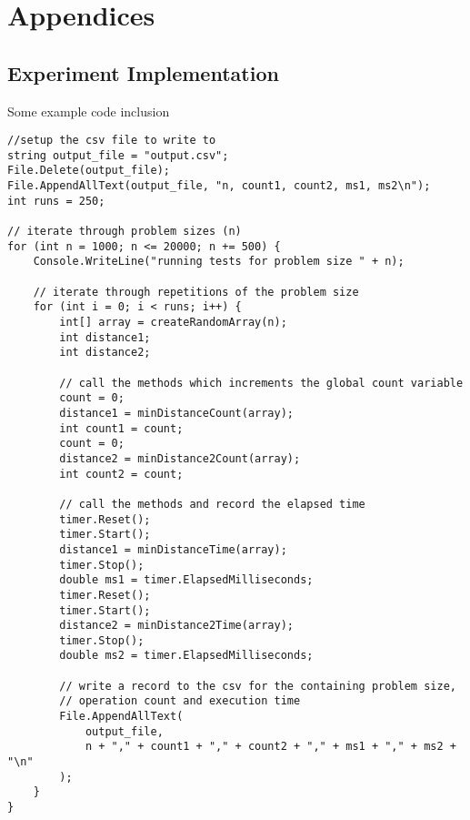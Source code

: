 \newpage
\section{Appendices}

\subsection{Experiment Implementation}\label{app:experiment}
Some example code inclusion

\begin{lstlisting}
//setup the csv file to write to
string output_file = "output.csv";
File.Delete(output_file);
File.AppendAllText(output_file, "n, count1, count2, ms1, ms2\n");
int runs = 250;

// iterate through problem sizes (n)
for (int n = 1000; n <= 20000; n += 500) {
    Console.WriteLine("running tests for problem size " + n);
    
    // iterate through repetitions of the problem size
    for (int i = 0; i < runs; i++) {
        int[] array = createRandomArray(n);
        int distance1;
        int distance2;

        // call the methods which increments the global count variable
        count = 0;
        distance1 = minDistanceCount(array);
        int count1 = count;
        count = 0;
        distance2 = minDistance2Count(array);
        int count2 = count;

        // call the methods and record the elapsed time
        timer.Reset();
        timer.Start();
        distance1 = minDistanceTime(array);
        timer.Stop();
        double ms1 = timer.ElapsedMilliseconds;
        timer.Reset();
        timer.Start();
        distance2 = minDistance2Time(array);
        timer.Stop();
        double ms2 = timer.ElapsedMilliseconds;

        // write a record to the csv for the containing problem size, 
        // operation count and execution time
        File.AppendAllText(
            output_file, 
            n + "," + count1 + "," + count2 + "," + ms1 + "," + ms2 + "\n"
        );
    }
}
\end{lstlisting}